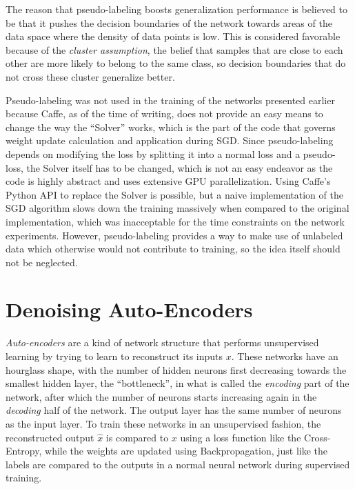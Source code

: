 The reason that pseudo-labeling boosts generalization performance is believed to be that it pushes the decision boundaries of the network towards areas of the data space where the density of data points is low. This is considered favorable because of the \textit{cluster assumption}, the belief that samples that are close to each other are more likely to belong to the same class, so decision boundaries that do not cross these cluster generalize better. \cite{pseudo_label}

Pseudo-labeling was not used in the training of the networks presented earlier because Caffe, as of the time of writing, does not provide an easy means to change the way the ``Solver'' works, which is the part of the code that governs weight update calculation and application during SGD. Since pseudo-labeling depends on modifying the loss by splitting it into a normal loss and a pseudo-loss, the Solver itself has to be changed, which is not an easy endeavor as the code is highly abstract and uses extensive GPU parallelization. Using Caffe's Python API to replace the Solver is possible, but a naive implementation of the SGD algorithm slows down the training massively when compared to the original implementation, which was inacceptable for the time constraints on the network experiments. However, pseudo-labeling provides a way to make use of unlabeled data which otherwise would not contribute to training, so the idea itself should not be neglected.


	\section{Denoising Auto-Encoders}

\textit{Auto-encoders} are a kind of network structure that performs unsupervised learning by trying to learn to reconstruct its inputs $x$. These networks have an hourglass shape, with the number of hidden neurons first decreasing towards the smallest hidden layer, the ``bottleneck'', in what is called the \textit{encoding} part of the network, after which the number of neurons starts increasing again in the \textit{decoding} half of the network. The output layer has the same number of neurons as the input layer. To train these networks in an unsupervised fashion, the reconstructed output $\hat{x}$ is compared to $x$ using a loss function like the Cross-Entropy, while the weights are updated using Backpropagation, just like the labels are compared to the outputs in a normal neural network during supervised training.

